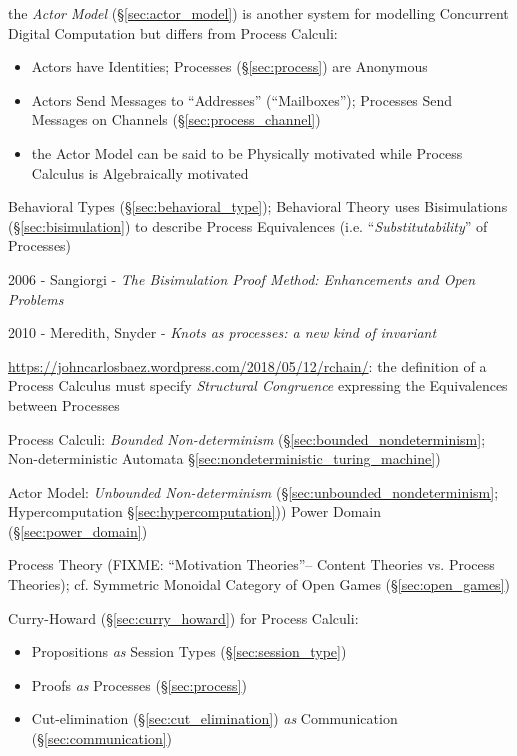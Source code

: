 \fist the \emph{Actor Model} (\S\ref{sec:actor_model}) is
another system for modelling Concurrent Digital Computation but
differs from Process Calculi:
\begin{itemize}
  \item Actors have Identities; Processes (\S\ref{sec:process}) are
    Anonymous
  \item Actors Send Messages to ``Addresses'' (``Mailboxes'');
    Processes Send Messages on Channels (\S\ref{sec:process_channel})
  \item the Actor Model can be said to be Physically motivated while
    Process Calculus is Algebraically motivated
\end{itemize}

\fist Behavioral Types (\S\ref{sec:behavioral_type}); Behavioral
Theory uses Bisimulations (\S\ref{sec:bisimulation}) to describe
Process Equivalences (i.e. ``\emph{Substitutability}'' of Processes)

2006 - Sangiorgi - \emph{The Bisimulation Proof Method: Enhancements and Open
  Problems}

2010 - Meredith, Snyder - \emph{Knots as processes: a new kind of invariant}

\url{https://johncarlosbaez.wordpress.com/2018/05/12/rchain/}: the definition
of a Process Calculus must specify \emph{Structural Congruence} expressing the
Equivalences between Processes


Process Calculi: \emph{Bounded Non-determinism}
(\S\ref{sec:bounded_nondeterminism}; \fist Non-deterministic Automata
\S\ref{sec:nondeterministic_turing_machine})

Actor Model: \emph{Unbounded Non-determinism}
(\S\ref{sec:unbounded_nondeterminism}; \fist Hypercomputation
\S\ref{sec:hypercomputation})) Power Domain (\S\ref{sec:power_domain})

Process Theory (FIXME: ``Motivation Theories''-- Content Theories vs. Process
Theories); cf. Symmetric Monoidal Category of Open Games
(\S\ref{sec:open_games})

Curry-Howard (\S\ref{sec:curry_howard}) for Process Calculi:
\begin{itemize}
  \item Propositions \emph{as} Session Types (\S\ref{sec:session_type})
  \item Proofs \emph{as} Processes (\S\ref{sec:process})
  \item Cut-elimination (\S\ref{sec:cut_elimination}) \emph{as}
    Communication (\S\ref{sec:communication})
\end{itemize}

